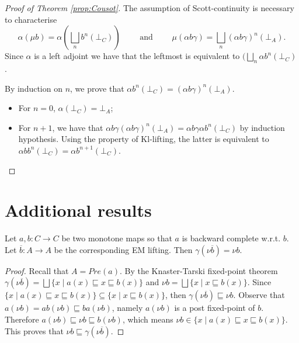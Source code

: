 \documentclass{llncs}
\begin{document}
\begin{proof}[Proof of Theorem \ref{prop:Cousot}]
The assumption of Scott-continuity is necessary to characterise 
%
$$\alpha(\mu b) = \alpha (\bigsqcup_{n} b^n(\bot_C) ) \qquad \text{ and } \qquad \mu(\alpha b \gamma) =  \bigsqcup_{n} (\alpha b \gamma)^n(\bot_A) \text{.}$$ 
Since $\alpha$ is a left adjoint we have that the leftmost is equivalent to  $ (\bigsqcup_{n}  \alpha b^n(\bot_C) $.

By induction on $n$, we prove that $\alpha b^n(\bot_C) = (\alpha b \gamma)^n (\bot_A)$.
\begin{itemize}
\item For $n=0$, $\alpha(\bot_C) = \bot_A$;
\item For $n+1$, we have that $\alpha b \gamma (\alpha b \gamma)^n (\bot_A) = \alpha b\gamma \alpha b^n (\bot_C)$ by induction hypothesis. Using the property of Kl-lifting, the latter is equivalent to $\alpha b b^n (\bot_C) = \alpha b^{n+1}(\bot_C)$.
\end{itemize}
\end{proof}


\section{Additional results}
\begin{proposition}
Let $a,b\colon C\to C$ be two monotone maps so that $a$ is backward complete w.r.t. $b$. Let $\overline{b}\colon A \to A$ be the corresponding EM lifting. Then $\gamma(\nu {\overline{b}}) = \nu b$.
\end{proposition}
\begin{proof}
Recall that $A = Pre(a)$. By the Knaster-Tarski fixed-point theorem  $\gamma(\nu {\overline{b}}) =  \bigsqcup \{ x  \mid a(x) \sqsubseteq x \sqsubseteq b(x) \}$ and  $\nu b = \bigsqcup \{ x  \mid x \sqsubseteq b(x) \}$. Since $\{ x  \mid a(x) \sqsubseteq x \sqsubseteq b(x) \} \subseteq \{ x  \mid x \sqsubseteq b(x) \}$, then $\gamma(\nu {\overline{b}}) \sqsubseteq \nu b$.
Observe that $a(\nu b) = ab(\nu b)\sqsubseteq ba(\nu b)$, namely $a(\nu b)$ is a post fixed-point of $b$. Therefore $a(\nu b) \sqsubseteq \nu b \sqsubseteq b(\nu b)$, which means $\nu b \in \{ x  \mid a(x) \sqsubseteq x \sqsubseteq b(x) \}$. This proves that $\nu b \sqsubseteq \gamma(\nu {\overline{b}})$.
\end{proof}
\end{document}
